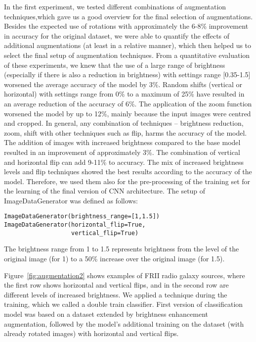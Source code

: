 \documentclass[fleqn,usenatbib]{mnras}
\begin{document}
In the first experiment, we tested different combinations of augmentation techniques,which gave us a good overview for the final selection of augmentations. Besides the expected use of rotations with approximately the 6-8\% improvement in accuracy for the original dataset, we were able to quantify the effects of additional augmentations (at least in a relative manner), which then helped us to select the final setup of augmentation techniques. From a quantitative evaluation of these experiments, we knew that the use of a large range of brightness (especially if there is also a reduction in brightness) with settings range [0.35-1.5] worsened the average accuracy of the model by 3\%. Random shifts (vertical or horizontal) with settings range from 0\% to a maximum of 25\% have resulted in an average reduction of the accuracy of 6\%. The application of the zoom function worsened the model by up to 12\%, mainly because the input images were centred and cropped. In general, any combination of techniques -- brightness reduction, zoom, shift with other techniques such as flip, harms the accuracy of the model. The addition of images with increased brightness compared to the base model resulted in an improvement of approximately 3\%.  The combination of vertical and horizontal flip can add 9-11\% to accuracy. The mix of increased brightness levels and flip techniques showed the best results according to the accuracy of the model. Therefore, we used them also for the pre-processing of the training set for the learning of the final version of CNN architecture. The setup of ImageDataGenerator was defined as follows:

\begin{verbatim}
ImageDataGenerator(brightness_range=[1,1.5])
ImageDataGenerator(horizontal_flip=True,
                   vertical_flip=True)
\end{verbatim}

The brightness range from 1 to 1.5 represents brightness from the level of the original image (for 1) to a 50\% increase over the original image (for 1.5).

Figure~\ref{fig:augmentation2} shows examples of FRII radio galaxy sources, where the first row shows horizontal and vertical flips, and in the second row are different levels of increased brightness. We applied a technique during the training, which we called a double train classifier. First version of classification model was based on a dataset extended by brightness enhancement augmentation, followed by the model's additional training on the dataset (with already rotated images) with horizontal and vertical flips.  
\end{document}
